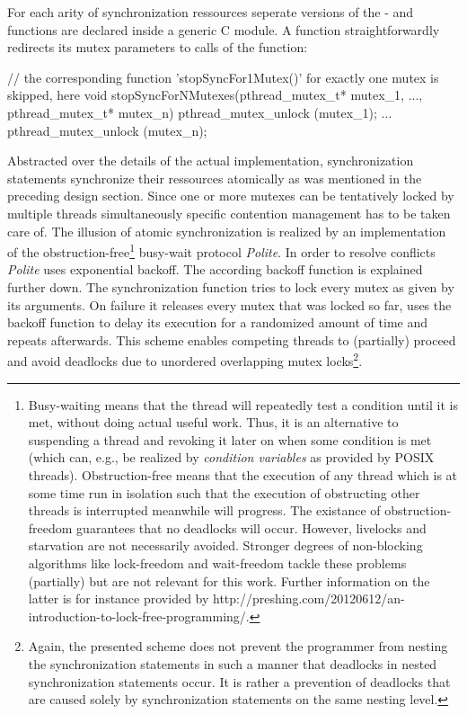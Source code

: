For each arity of synchronization ressources seperate versions of the - and  functions are declared inside a generic C module. A  function straightforwardly redirects its mutex parameters to calls of the  function:
\begin{ccode}
// the corresponding function 'stopSyncFor1Mutex()' for exactly one mutex is skipped, here
void stopSyncForNMutexes(pthread_mutex_t* mutex_1, ..., pthread_mutex_t* mutex_n) { 
  pthread_mutex_unlock (mutex_1);
  ...
  pthread_mutex_unlock (mutex_n); 
}
\end{ccode}

Abstracted over the details of the actual implementation, synchronization statements synchronize their ressources atomically as was mentioned in the preceding design section. Since one or more mutexes can be tentatively locked by multiple threads simultaneously specific contention management has to be taken care of. The illusion of atomic synchronization is realized by an implementation of the obstruction-free\footnote{Busy-waiting means that the thread will repeatedly test a condition until it is met, without doing actual useful work\cite[p.~166]{AnIntroductionToParallelProgramming}. Thus, it is an alternative to suspending a thread and revoking it later on when some condition is met (which can, e.g., be realized by \textit{condition variables} as provided by POSIX threads\cite[p.~77]{ProgrammingWithPOSIXThreads}). Obstruction-free means that the execution of any thread which is at some time run in isolation such that the execution of obstructing other threads is interrupted meanwhile will progress. The existance of obstruction-freedom guarantees that no deadlocks will occur\cite{ObstructionFreeAuthorizationEnforcement}. However, livelocks and starvation are not necessarily avoided. Stronger degrees of non-blocking algorithms like lock-freedom and wait-freedom tackle these problems (partially) but are not relevant for this work. Further information on the latter is for instance provided by http://preshing.com/20120612/an-introduction-to-lock-free-programming/. %
} busy-wait protocol \textit{Polite}. In order to resolve conflicts \textit{Polite} uses exponential backoff. The according backoff function is explained further down. The synchronization function tries to lock every mutex as given by its arguments. On failure it releases every mutex that was locked so far, uses the backoff function to delay its execution for a randomized amount of time and repeats afterwards. This scheme enables competing threads to (partially) proceed and avoid deadlocks due to unordered overlapping mutex locks\footnote{Again, the presented scheme does not prevent the programmer from nesting the synchronization statements in such a manner that deadlocks in nested synchronization statements occur. It is rather a prevention of deadlocks that are caused solely by synchronization statements on the same nesting level.}.
